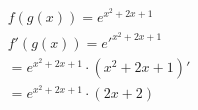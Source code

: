 \documentclass[preview]{standalone}
\begin{document}
\begin{align*}
f(g(x))=e^{x^2+2x+1}\\ f'(g(x))=e'^{x^2+2x+1}\\ =e^{x^2+2x+1} \cdot (x^2+2x+1)'\\ =e^{x^2+2x+1} \cdot (2x+2)
\end{align*}
\end{document}
